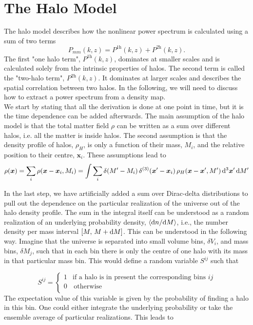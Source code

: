 \documentclass[../main.tex]{subfiles}
\begin{document}
\section{The Halo Model}\label{sec:halo_model}
The halo model describes how the nonlinear power spectrum is calculated using a sum of two terms 
\begin{equation}
    P_{mm}(k,z) = P^\mathrm{1h}(k,z) + P^\mathrm{2h}(k,z).
\end{equation}
The first "one halo term", $P^\mathrm{1h}(k,z)$, dominates at smaller scales and is calculated solely from the intrinsic properties of halos. The second term is called the "two-halo term", $P^\mathrm{2h}(k,z)$. It dominates at larger scales and describes the spatial correlation between two halos. In the following, we will need to discuss how to extract a power spectrum from a density map.\\
We start by stating that all the derivation is done at one point in time, but it is the time dependence can be added afterwards. The main assumption of the halo model is that the total matter field $\rho$ can be written as a sum over different halos, i.e. all the matter is inside halos. 
The second assumption is that the density profile of halos, $\rho_H$, is only a function of their mass, $M_i$, and the relative position to their centre, $\boldsymbol{x}_i$. These assumptions lead to 
\begin{equation}
\label{eq:halo_denisity_field}
\rho(\boldsymbol{x}) = \sum_i \rho(\boldsymbol{x}-\boldsymbol{x}_i,M_i)=\int \sum_i \delta(M'-M_i)\,\delta^{(3)}(\boldsymbol{x}'-\boldsymbol{x}_i)\,\rho_H(\boldsymbol{x}-\boldsymbol{x}',M')\, \mathrm{d}^3 \boldsymbol{x}' \, \mathrm{d} M'
\end{equation}

In the last step, we have artificially added a sum over Dirac-delta distributions to pull out the dependence on the particular realization of the universe out of the halo density profile. The sum in the integral itself can be understood as a random realization of an underlying probability density, $\langle \mathrm{d} n/\mathrm{d} M \rangle$, i.e., the number density per mass interval $[M,\,M+\mathrm{d} M]$. This can be understood in the following way. Imagine that the universe is separated into small volume bins, $\delta V_i$, and mass bins, $\delta M_j$, such that in each bin there is only the centre of one halo with its mass in that particular mass bin. This would define a random variable $S^{ij}$ such that 

\begin{equation*}
S^{ij} = \left\{ \begin{array}{ll}
    1 & \text{if a halo is in present the corresponding bins } ij \\
    0 & \, \textrm{otherwise} \\
    \end{array}  \right.    
\end{equation*}
The expectation value of this variable is given by the probability of finding a halo in this bin. One could either integrate the underlying probability or take the ensemble average of particular realizations. This leads to
\end{document}
